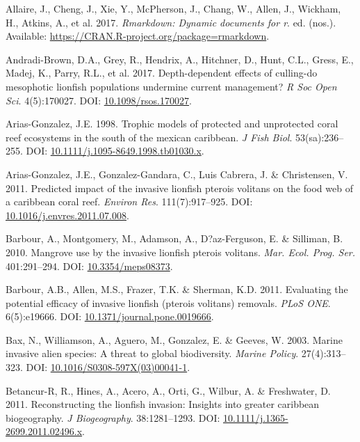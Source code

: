\documentclass[12pt,]{article}
\begin{document}
\hypertarget{ref-rmarkdown_2017}{}
Allaire, J., Cheng, J., Xie, Y., McPherson, J., Chang, W., Allen, J.,
Wickham, H., Atkins, A., et al. 2017. \emph{Rmarkdown: Dynamic documents
for r}. ed. (nos.). Available:
\url{https://CRAN.R-project.org/package=rmarkdown}.

\hypertarget{ref-andradibrown_2017}{}
Andradi-Brown, D.A., Grey, R., Hendrix, A., Hitchner, D., Hunt, C.L.,
Gress, E., Madej, K., Parry, R.L., et al. 2017. Depth-dependent effects
of culling-do mesophotic lionfish populations undermine current
management? \emph{R Soc Open Sci}. 4(5):170027. DOI:
\href{https://doi.org/10.1098/rsos.170027}{10.1098/rsos.170027}.

\hypertarget{ref-ariasgonzalez_1998}{}
Arias-Gonzalez, J.E. 1998. Trophic models of protected and unprotected
coral reef ecosystems in the south of the mexican caribbean. \emph{J
Fish Biol}. 53(sa):236--255. DOI:
\href{https://doi.org/10.1111/j.1095-8649.1998.tb01030.x}{10.1111/j.1095-8649.1998.tb01030.x}.

\hypertarget{ref-ariasgonzalez_2011}{}
Arias-Gonzalez, J.E., Gonzalez-Gandara, C., Luis Cabrera, J. \&
Christensen, V. 2011. Predicted impact of the invasive lionfish pterois
volitans on the food web of a caribbean coral reef. \emph{Environ Res}.
111(7):917--925. DOI:
\href{https://doi.org/10.1016/j.envres.2011.07.008}{10.1016/j.envres.2011.07.008}.

\hypertarget{ref-barbour_2010}{}
Barbour, A., Montgomery, M., Adamson, A., D?az-Ferguson, E. \& Silliman,
B. 2010. Mangrove use by the invasive lionfish pterois volitans.
\emph{Mar. Ecol. Prog. Ser.} 401:291--294. DOI:
\href{https://doi.org/10.3354/meps08373}{10.3354/meps08373}.

\hypertarget{ref-barbour_2011}{}
Barbour, A.B., Allen, M.S., Frazer, T.K. \& Sherman, K.D. 2011.
Evaluating the potential efficacy of invasive lionfish (pterois
volitans) removals. \emph{PLoS ONE}. 6(5):e19666. DOI:
\href{https://doi.org/10.1371/journal.pone.0019666}{10.1371/journal.pone.0019666}.

\hypertarget{ref-bax_2003}{}
Bax, N., Williamson, A., Aguero, M., Gonzalez, E. \& Geeves, W. 2003.
Marine invasive alien species: A threat to global biodiversity.
\emph{Marine Policy}. 27(4):313--323. DOI:
\href{https://doi.org/10.1016/S0308-597X(03)00041-1}{10.1016/S0308-597X(03)00041-1}.

\hypertarget{ref-betancurr_2011}{}
Betancur-R, R., Hines, A., Acero, A., Orti, G., Wilbur, A. \&
Freshwater, D. 2011. Reconstructing the lionfish invasion: Insights into
greater caribbean biogeography. \emph{J Biogeography}. 38:1281--1293.
DOI:
\href{https://doi.org/10.1111/j.1365-2699.2011.02496.x}{10.1111/j.1365-2699.2011.02496.x}.
\end{document}

